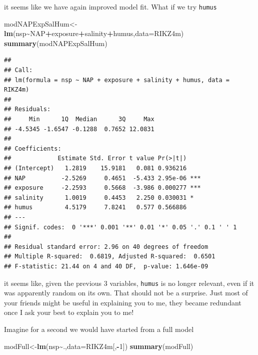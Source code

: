 \documentclass[
]{book}
\newenvironment{Shaded}{\begin{snugshade}}{\end{snugshade}}
\newcommand{\AttributeTok}[1]{\textcolor[rgb]{0.13,0.29,0.53}{#1}}
\newcommand{\DecValTok}[1]{\textcolor[rgb]{0.00,0.00,0.81}{#1}}
\newcommand{\FunctionTok}[1]{\textcolor[rgb]{0.13,0.29,0.53}{\textbf{#1}}}
\newcommand{\NormalTok}[1]{#1}
\newcommand{\OtherTok}[1]{\textcolor[rgb]{0.56,0.35,0.01}{#1}}
\newcommand{\SpecialCharTok}[1]{\textcolor[rgb]{0.81,0.36,0.00}{\textbf{#1}}}
\begin{document}
it seems like we have again improved model fit. What if we try \texttt{humus}

\begin{Shaded}
\begin{Highlighting}[]
\NormalTok{modNAPExpSalHum}\OtherTok{\textless{}{-}}\FunctionTok{lm}\NormalTok{(nsp}\SpecialCharTok{\textasciitilde{}}\NormalTok{NAP}\SpecialCharTok{+}\NormalTok{exposure}\SpecialCharTok{+}\NormalTok{salinity}\SpecialCharTok{+}\NormalTok{humus,}\AttributeTok{data=}\NormalTok{RIKZ4m)}
\FunctionTok{summary}\NormalTok{(modNAPExpSalHum)}
\end{Highlighting}
\end{Shaded}

\begin{verbatim}
## 
## Call:
## lm(formula = nsp ~ NAP + exposure + salinity + humus, data = RIKZ4m)
## 
## Residuals:
##     Min      1Q  Median      3Q     Max 
## -4.5345 -1.6547 -0.1288  0.7652 12.0831 
## 
## Coefficients:
##             Estimate Std. Error t value Pr(>|t|)    
## (Intercept)   1.2819    15.9181   0.081 0.936216    
## NAP          -2.5269     0.4651  -5.433 2.95e-06 ***
## exposure     -2.2593     0.5668  -3.986 0.000277 ***
## salinity      1.0019     0.4453   2.250 0.030031 *  
## humus         4.5179     7.8241   0.577 0.566886    
## ---
## Signif. codes:  0 '***' 0.001 '**' 0.01 '*' 0.05 '.' 0.1 ' ' 1
## 
## Residual standard error: 2.96 on 40 degrees of freedom
## Multiple R-squared:  0.6819, Adjusted R-squared:  0.6501 
## F-statistic: 21.44 on 4 and 40 DF,  p-value: 1.646e-09
\end{verbatim}

it seems like, given the previous 3 variables, \texttt{humus} is no longer relevant, even if it was apparently random on its own. That should not be a surprise. Just most of your friends might be useful in explaining you to me, they became redundant once I ask your best to explain you to me!

Imagine for a second we would have started from a full model

\begin{Shaded}
\begin{Highlighting}[]
\NormalTok{modFull}\OtherTok{\textless{}{-}}\FunctionTok{lm}\NormalTok{(nsp}\SpecialCharTok{\textasciitilde{}}\NormalTok{.,}\AttributeTok{data=}\NormalTok{RIKZ4m[,}\SpecialCharTok{{-}}\DecValTok{1}\NormalTok{])}
\FunctionTok{summary}\NormalTok{(modFull)}
\end{Highlighting}
\end{Shaded}
\end{document}
